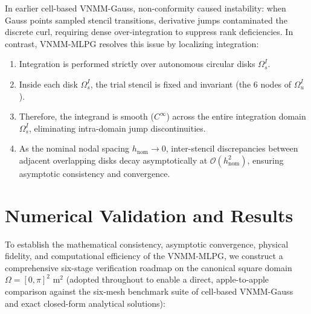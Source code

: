 \documentclass[VANCOUVER,Times1COL]{WileyNJD-v5}
\begin{document}
In earlier cell-based VNMM-Gauss, non-conformity caused instability: when Gauss points sampled stencil transitions, derivative jumps contaminated the discrete curl, requiring dense over-integration to suppress rank deficiencies. In contrast, VNMM-MLPG resolves this issue by localizing integration:
\begin{enumerate}
    \item Integration is performed strictly over autonomous circular disks $\Omega_s^I$.
    \item Inside each disk $\Omega_s^I$, the trial stencil is fixed and invariant (the 6 nodes of $\Omega_u^I$).
    \item Therefore, the integrand is smooth ($C^\infty$) across the entire integration domain $\Omega_s^I$, eliminating intra-domain jump discontinuities.
    \item As the nominal nodal spacing $h_{\mathrm{nom}} \to 0$, inter-stencil discrepancies between adjacent overlapping disks decay asymptotically at $\mathcal{O}(h_{\mathrm{nom}}^2)$, ensuring asymptotic consistency and convergence.
\end{enumerate}

\section{Numerical Validation and Results}
\label{sec:results}

To establish the mathematical consistency, asymptotic convergence, physical fidelity, and computational efficiency of the VNMM-MLPG, we construct a comprehensive six-stage verification roadmap on the canonical square domain $\Omega = [0, \pi]^2\text{ m}^2$ (adopted throughout to enable a direct, apple-to-apple comparison against the six-mesh benchmark suite of cell-based VNMM-Gauss \cite{stable_vnmm2d_2026} and exact closed-form analytical solutions):
\end{document}

